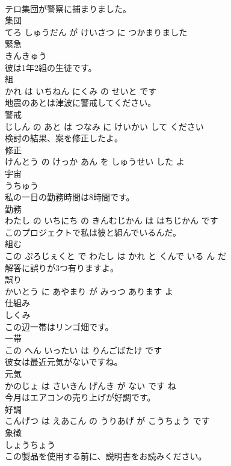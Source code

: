 \documentclass[8pt]{extreport}
\begin{document}
\begin{CJK}{UTF8}{min}
\\	テロ集団が警察に捕まりました。	
\\	集団 
\\	てろ しゅうだん が けいさつ に つかまりました			
\\	緊急	
\\	きんきゅう			
\\	彼は1年2組の生徒です。	
\\	組 
\\	かれ は いちねん にくみ の せいと です			
\\	地震のあとは津波に警戒してください。	
\\	警戒 
\\	じしん の あと は つなみ に けいかい して ください			
\\	検討の結果、案を修正したよ。	
\\	修正 
\\	けんとう の けっか あん を しゅうせい した よ			
\\	宇宙	
\\	うちゅう			
\\	私の一日の勤務時間は8時間です。	
\\	勤務 
\\	わたし の いちにち の きんむじかん は はちじかん です			
\\	このプロジェクトで私は彼と組んでいるんだ。	
\\	組む 
\\	この ぷろじぇくと で わたし は かれ と くんで いる ん だ			
\\	解答に誤りが3つ有りますよ。	
\\	誤り 
\\	かいとう に あやまり が みっつ あります よ			
\\	仕組み	
\\	しくみ			
\\	この辺一帯はリンゴ畑です。	
\\	一帯 
\\	この へん いったい は りんごばたけ です			
\\	彼女は最近元気がないですね。	
\\	元気 
\\	かのじょ は さいきん げんき が ない です ね			
\\	今月はエアコンの売り上げが好調です。	
\\	好調 
\\	こんげつ は えあこん の うりあげ が こうちょう です			
\\	象徴	
\\	しょうちょう			
\\	この製品を使用する前に、説明書をお読みください。	

\end{CJK}
\end{document}

